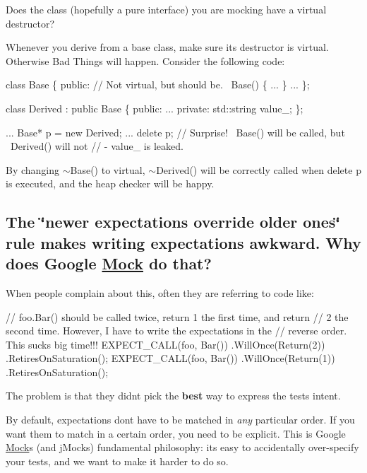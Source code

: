 Does the class (hopefully a pure interface) you are mocking have a virtual destructor?

Whenever you derive from a base class, make sure its destructor is virtual. Otherwise Bad Things will happen. Consider the following code\+:


\begin{DoxyCode}
\textcolor{keyword}{class }Base \{
 \textcolor{keyword}{public}:
  \textcolor{comment}{// Not virtual, but should be.}
  ~Base() \{ ... \}
  ...
\};

\textcolor{keyword}{class }Derived : \textcolor{keyword}{public} Base \{
 \textcolor{keyword}{public}:
  ...
 \textcolor{keyword}{private}:
  std::string value\_;
\};

...
  Base* p = \textcolor{keyword}{new} Derived;
  ...
  \textcolor{keyword}{delete} p;  \textcolor{comment}{// Surprise! ~Base() will be called, but ~Derived() will not}
             \textcolor{comment}{// - value\_ is leaked.}
\end{DoxyCode}


By changing {\ttfamily $\sim$\+Base()} to virtual, {\ttfamily $\sim$\+Derived()} will be correctly called when {\ttfamily delete p} is executed, and the heap checker will be happy.

\subsection*{The \char`\"{}newer expectations override older ones\char`\"{} rule makes writing expectations awkward. Why does Google \hyperlink{classMock}{Mock} do that?}

When people complain about this, often they are referring to code like\+:


\begin{DoxyCode}
\textcolor{comment}{// foo.Bar() should be called twice, return 1 the first time, and return}
\textcolor{comment}{// 2 the second time.  However, I have to write the expectations in the}
\textcolor{comment}{// reverse order.  This sucks big time!!!}
EXPECT\_CALL(foo, Bar())
    .WillOnce(Return(2))
    .RetiresOnSaturation();
EXPECT\_CALL(foo, Bar())
    .WillOnce(Return(1))
    .RetiresOnSaturation();
\end{DoxyCode}


The problem is that they didn\textquotesingle{}t pick the {\bfseries best} way to express the test\textquotesingle{}s intent.

By default, expectations don\textquotesingle{}t have to be matched in {\itshape any} particular order. If you want them to match in a certain order, you need to be explicit. This is Google \hyperlink{classMock}{Mock}\textquotesingle{}s (and j\+Mock\textquotesingle{}s) fundamental philosophy\+: it\textquotesingle{}s easy to accidentally over-\/specify your tests, and we want to make it harder to do so.

